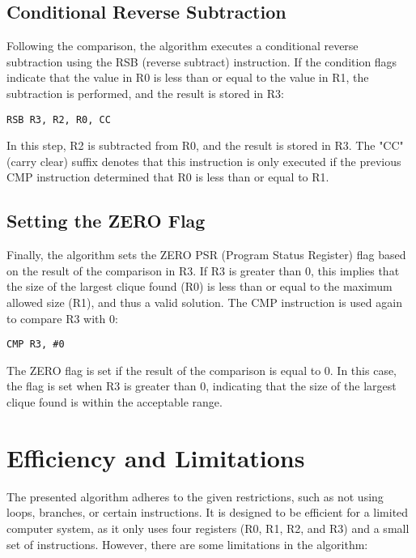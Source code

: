 \subsection{Conditional Reverse Subtraction}

Following the comparison, the algorithm executes a conditional reverse subtraction using the RSB (reverse subtract) instruction. If the condition flags indicate that the value in R0 is less than or equal to the value in R1, the subtraction is performed, and the result is stored in R3:

\begin{verbatim}
RSB R3, R2, R0, CC
\end{verbatim}

In this step, R2 is subtracted from R0, and the result is stored in R3. The "CC" (carry clear) suffix denotes that this instruction is only executed if the previous CMP instruction determined that R0 is less than or equal to R1.

\subsection{Setting the ZERO Flag}

Finally, the algorithm sets the ZERO PSR (Program Status Register) flag based on the result of the comparison in R3. If R3 is greater than 0, this implies that the size of the largest clique found (R0) is less than or equal to the maximum allowed size (R1), and thus a valid solution. The CMP instruction is used again to compare R3 with 0:

\begin{verbatim}
CMP R3, #0
\end{verbatim}

The ZERO flag is set if the result of the comparison is equal to 0. In this case, the flag is set when R3 is greater than 0, indicating that the size of the largest clique found is within the acceptable range.

\section{Efficiency and Limitations}

The presented algorithm adheres to the given restrictions, such as not using loops, branches, or certain instructions. It is designed to be efficient for a limited computer system, as it only uses four registers (R0, R1, R2, and R3) and a small set of instructions. However, there are some limitations in the algorithm:

